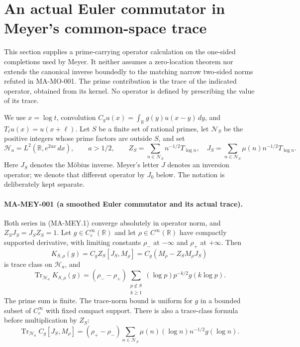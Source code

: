 \section{An actual Euler commutator in Meyer's common-space trace}
\label{sec:meyer-transport}

This section supplies a prime-carrying operator calculation on the
one-sided completions used by Meyer.  It neither assumes a zero-location
theorem nor extends the canonical inverse boundedly to the matching
narrow two-sided norms refuted in MA-MO-001.  The prime contribution is
the trace of the indicated operator, obtained from its kernel.  No
operator is defined by prescribing the value of its trace.

We use $x=\log t$, convolution
$C_g u(x)=\int_{\mathbb R}g(y)u(x-y)\,dy$, and
$T_\ell u(x)=u(x+\ell)$.  Let $S$ be a finite set of rational primes,
let $\mathcal N_S$ be the positive integers whose prime factors are
outside $S$, and set
\[
 \mathcal H_a=L^2(\mathbb R,e^{2ax}\,dx),\qquad a>1/2,
 \qquad
 Z_S=\sum_{n\in\mathcal N_S}n^{-1/2}T_{\log n},\quad
 J_S=\sum_{n\in\mathcal N_S}\mu(n)n^{-1/2}T_{\log n}.
 \tag{MA-MEY.1}
\]
Here $J_S$ denotes the M\"obius inverse.  Meyer's letter $J$ denotes
an inversion operator; we denote that different operator by $J_0$
below.  The notation is deliberately kept separate.

\paragraph{MA-MEY-001 (a smoothed Euler commutator and its actual trace).}
Both series in (MA-MEY.1) converge absolutely in operator norm,
and $Z_SJ_S=J_SZ_S=1$.  Let $g\in C_c^\infty(\mathbb R)$ and let
$\rho\in C^\infty(\mathbb R)$ have compactly supported derivative,
with limiting constants $\rho_-$ at $-\infty$ and $\rho_+$ at
$+\infty$.  Then
\[
 K_{S,\rho}(g)=C_gZ_S[J_S,M_\rho]
             =C_g(M_\rho-Z_SM_\rho J_S)
 \tag{MA-MEY.2}
\]
is trace class on $\mathcal H_a$, and
\[
 \boxed{\operatorname{Tr}_{\mathcal H_a}K_{S,\rho}(g)
 = (\rho_- -\rho_+)
   \sum_{\substack{p\notin S\\ k\ge1}}
     (\log p)p^{-k/2}g(k\log p).}
 \tag{MA-MEY.3}
\]
The prime sum is finite.  The trace-norm bound is uniform for $g$
in a bounded subset of $C_c^\infty$ with fixed compact support.
There is also a trace-class formula before multiplication by $Z_S$:
\[
 \operatorname{Tr}_{\mathcal H_a}C_g[J_S,M_\rho]
 = (\rho_+-\rho_-)
   \sum_{n\in\mathcal N_S}\mu(n)(\log n)n^{-1/2}g(\log n).
 \tag{MA-MEY.4}
\]

